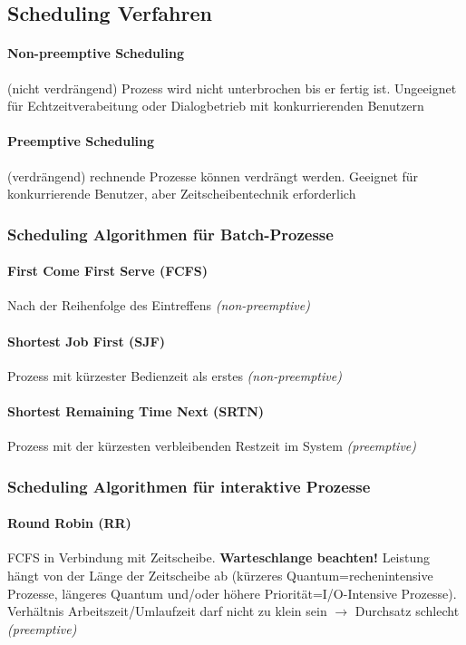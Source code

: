 \documentclass[10pt,a4paper,landscape]{article}
\begin{document}
\begin{multicols*}{3}
	\subsection{Scheduling Verfahren}
	\paragraph{Non-preemptive Scheduling} (nicht verdrängend) Prozess wird nicht unterbrochen bis er fertig ist. Ungeeignet für Echtzeitverabeitung oder Dialogbetrieb mit konkurrierenden Benutzern
	\paragraph{Preemptive Scheduling} (verdrängend) rechnende Prozesse können verdrängt werden. Geeignet für konkurrierende Benutzer, aber Zeitscheibentechnik erforderlich
	\subsubsection{Scheduling Algorithmen für Batch-Prozesse}
	\paragraph{First Come First Serve (FCFS)} Nach der Reihenfolge des Eintreffens \textit{(non-preemptive)}
	\paragraph{Shortest Job First (SJF)} Prozess mit kürzester Bedienzeit als erstes \textit{(non-preemptive)}
	\paragraph{Shortest Remaining Time Next (SRTN)} Prozess mit der kürzesten verbleibenden Restzeit im System \textit{(preemptive)}
	\subsubsection{Scheduling Algorithmen für interaktive Prozesse}
	\paragraph{Round Robin (RR)} FCFS in Verbindung mit Zeitscheibe. \textbf{Warteschlange beachten!} Leistung hängt von der Länge der Zeitscheibe ab (kürzeres Quantum=rechenintensive Prozesse, längeres Quantum und/oder höhere Priorität=I/O-Intensive Prozesse). Verhältnis Arbeitszeit/Umlaufzeit darf nicht zu klein sein $\rightarrow$ Durchsatz schlecht \textit{(preemptive)}

\end{multicols*}
\end{document}
